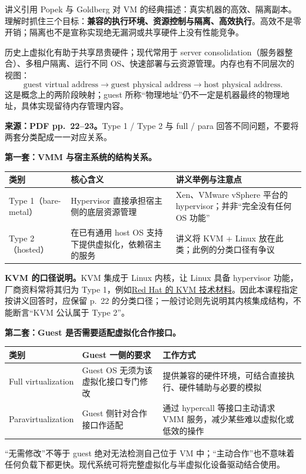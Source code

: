 讲义引用 Popek 与 Goldberg 对 VM 的经典描述：真实机器的高效、隔离副本。理解时抓住三个目标：\textbf{兼容的执行环境、资源控制与隔离、高效执行}。高效不是零开销；隔离也不是宣称实现绝无漏洞或共享硬件上没有性能竞争。

历史上虚拟化有助于共享昂贵硬件；现代常用于 server consolidation（服务器整合）、多租户隔离、运行不同 OS、快速部署与云资源管理。内存也有不同层次的视图：
\[
\text{guest virtual address}
\longrightarrow\text{guest physical address}
\longrightarrow\text{host physical address}.
\]
这是概念上的两阶段映射；guest 所称“物理地址”仍不一定是机器最终的物理地址，具体实现留待内存管理内容。


\textbf{来源：PDF pp.~22--23。}Type 1 / Type 2 与 full / para 回答不同问题，不要将两套分类配成一一对应关系。

\par\noindent\begin{minipage}{\textwidth}
\textbf{第一套：VMM 与宿主系统的结构关系。}
\begin{center}
\begin{tabularx}{\textwidth}{@{}lXX@{}}
\toprule
类别 & 核心含义 & 讲义举例与注意点 \\
\midrule
Type 1（bare-metal） & Hypervisor 直接承担宿主侧的底层资源管理 & Xen、VMware vSphere 平台的 hypervisor；并非“完全没有任何 OS 功能” \\
Type 2（hosted） & 在已有通用 host OS 支持下提供虚拟化，依赖宿主的服务 & 讲义将 KVM + Linux 放在此类；此例的分类口径有争议 \\
\bottomrule
\end{tabularx}
\end{center}
\end{minipage}\par

\textbf{KVM 的口径说明。}KVM 集成于 Linux 内核，让 Linux 具备 hypervisor 功能，厂商资料常将其归为 Type 1，例如\href{https://people.redhat.com/mlessard/blog/GTEC09PRESENTATION.pdf}{Red Hat 的 KVM 技术材料}。因此本课程指定按讲义回答时，应保留 p.~22 的分类口径；一般讨论则先说明其内核集成结构，不能断言“KVM 公认属于 Type 2”。

\textbf{第二套：Guest 是否需要适配虚拟化合作接口。}
\begin{center}
\begin{tabularx}{\textwidth}{@{}lXX@{}}
\toprule
类别 & Guest 一侧的要求 & 工作方式 \\
\midrule
Full virtualization & Guest OS 无须为该虚拟化接口专门修改 & 提供兼容的硬件环境，可结合直接执行、硬件辅助与必要的模拟 \\
Paravirtualization & Guest 侧针对合作接口作适配 & 通过 hypercall 等接口主动请求 VMM 服务，减少某些难以虚拟化或低效的操作 \\
\bottomrule
\end{tabularx}
\end{center}
“无需修改”不等于 guest 绝对无法检测自己位于 VM 中；“主动合作”也不意味着任何负载下都更快。现代系统可将完整虚拟化与半虚拟化设备驱动结合使用。

